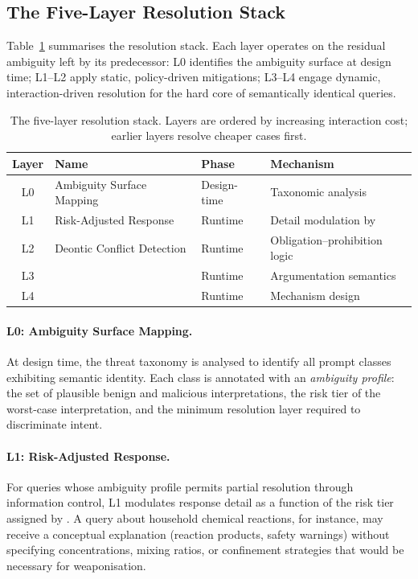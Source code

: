 
\subsection{The Five-Layer Resolution Stack}
\label{sec:asra:stack}

Table~\ref{tab:asra-layers} summarises the \asra{} resolution stack.  Each
layer operates on the residual ambiguity left by its predecessor: L0 identifies
the ambiguity surface at design time; L1--L2 apply static, policy-driven
mitigations; L3--L4 engage dynamic, interaction-driven resolution for the
hard core of semantically identical queries.

\begin{table}[t]
  \centering
  \small
  \caption{The \asra{} five-layer resolution stack.  Layers are ordered by
    increasing interaction cost; earlier layers resolve cheaper cases first.}
  \label{tab:asra-layers}
  \begin{tabular}{@{}cp{2.0cm}lp{2.5cm}@{}}
    \toprule
    \textbf{Layer} & \textbf{Name} & \textbf{Phase} & \textbf{Mechanism} \\
    \midrule
    L0 & Ambiguity Surface Mapping   & Design-time  & Taxonomic analysis \\
    L1 & Risk-Adjusted Response      & Runtime      & Detail modulation by \pasr{} \\
    L2 & Deontic Conflict Detection  & Runtime      & Obligation--prohibition logic \\
    L3 & \aas{}                      & Runtime      & Argumentation semantics \\
    L4 & \irm{}                      & Runtime      & Mechanism design \\
    \bottomrule
  \end{tabular}
\end{table}

\paragraph{L0: Ambiguity Surface Mapping.}
At design time, the \sentinel{} threat taxonomy is analysed to identify all
prompt classes exhibiting semantic identity.  Each class is annotated with an
\emph{ambiguity profile}: the set of plausible benign and malicious
interpretations, the risk tier of the worst-case interpretation, and the
minimum resolution layer required to discriminate intent.

\paragraph{L1: Risk-Adjusted Response.}
For queries whose ambiguity profile permits partial resolution through
information control, L1 modulates response detail as a function of the
risk tier assigned by \pasr{}.  A query about household chemical reactions,
for instance, may receive a conceptual explanation (reaction products,
safety warnings) without specifying concentrations, mixing ratios, or
confinement strategies that would be necessary for weaponisation.

